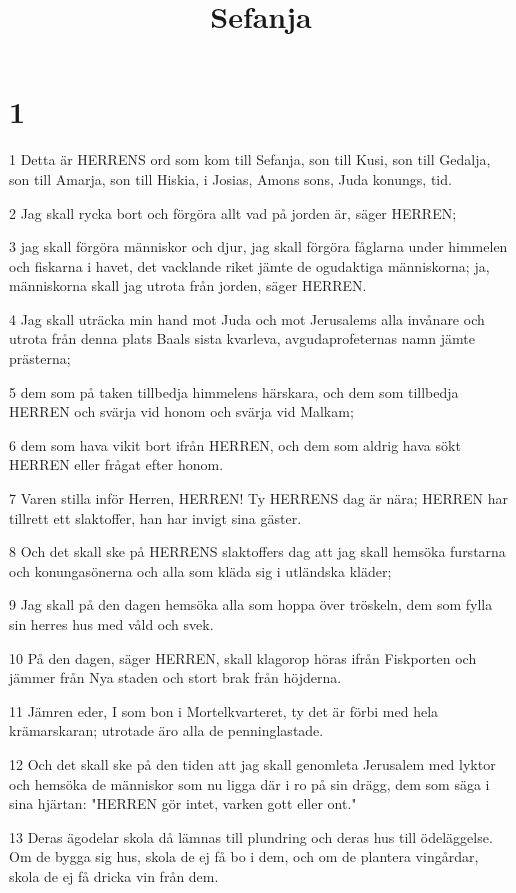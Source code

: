 

\title{Sefanja}


\chapter{1}

\par 1 Detta är HERRENS ord som kom till Sefanja, son till Kusi, son till Gedalja, son till Amarja, son till Hiskia, i Josias, Amons sons, Juda konungs, tid.
\par 2 Jag skall rycka bort och förgöra allt vad på jorden är, säger HERREN;
\par 3 jag skall förgöra människor och djur, jag skall förgöra fåglarna under himmelen och fiskarna i havet, det vacklande riket jämte de ogudaktiga människorna; ja, människorna skall jag utrota från jorden, säger HERREN.
\par 4 Jag skall uträcka min hand mot Juda och mot Jerusalems alla invånare och utrota från denna plats Baals sista kvarleva, avgudaprofeternas namn jämte prästerna;
\par 5 dem som på taken tillbedja himmelens härskara, och dem som tillbedja HERREN och svärja vid honom och svärja vid Malkam;
\par 6 dem som hava vikit bort ifrån HERREN, och dem som aldrig hava sökt HERREN eller frågat efter honom.
\par 7 Varen stilla inför Herren, HERREN! Ty HERRENS dag är nära; HERREN har tillrett ett slaktoffer, han har invigt sina gäster.
\par 8 Och det skall ske på HERRENS slaktoffers dag att jag skall hemsöka furstarna och konungasönerna och alla som kläda sig i utländska kläder;
\par 9 Jag skall på den dagen hemsöka alla som hoppa över tröskeln, dem som fylla sin herres hus med våld och svek.
\par 10 På den dagen, säger HERREN, skall klagorop höras ifrån Fiskporten och jämmer från Nya staden och stort brak från höjderna.
\par 11 Jämren eder, I som bon i Mortelkvarteret, ty det är förbi med hela krämarskaran; utrotade äro alla de penninglastade.
\par 12 Och det skall ske på den tiden att jag skall genomleta Jerusalem med lyktor och hemsöka de människor som nu ligga där i ro på sin drägg, dem som säga i sina hjärtan: "HERREN gör intet, varken gott eller ont."
\par 13 Deras ägodelar skola då lämnas till plundring och deras hus till ödeläggelse. Om de bygga sig hus, skola de ej få bo i dem, och om de plantera vingårdar, skola de ej få dricka vin från dem.
